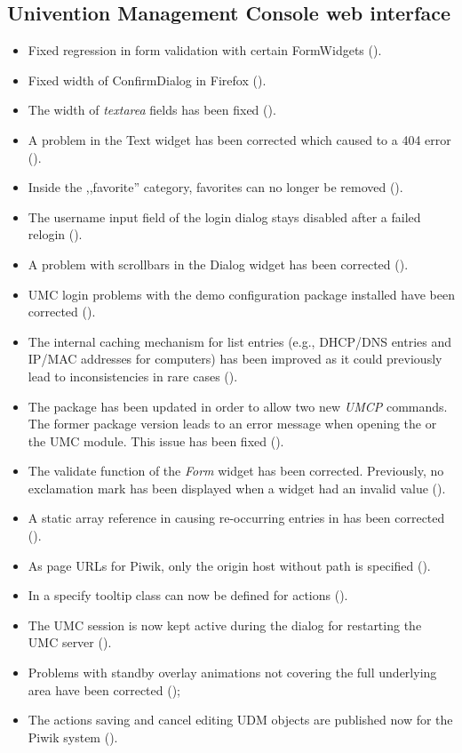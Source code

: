 \subsection{Univention Management Console web interface}
\begin{itemize}
\item Fixed regression in form validation with certain FormWidgets
  ().
\item Fixed width of ConfirmDialog in Firefox ().
\item The width of \emph{textarea} fields has been fixed
  ().
\item A problem in the Text widget has been corrected which caused to
  a 404 error ().
\item Inside the ,,favorite'' category, favorites can no longer be
  removed ().
\item The username input field of the login dialog stays disabled
  after a failed relogin ().
\item A problem with scrollbars in the Dialog widget has been
  corrected ().
\item UMC login problems with the demo configuration package installed have
  been corrected ().
\item The internal caching mechanism for list entries (e.g., DHCP/DNS
  entries and IP/MAC addresses for computers) has been improved as it
  could previously lead to inconsistencies in rare cases ().
\item The  package has been
  updated in order to allow two new \emph{UMCP} commands. The former
  package version leads to an error message when opening the
   or the  UMC module. This
  issue has been fixed ().
\item The validate function of the \emph{Form} widget has been corrected.
  Previously, no exclamation mark has been displayed when a widget had an
  invalid value ().
\item A static array reference in  causing re-occurring
  entries in  has been corrected ().
\item As page URLs for Piwik, only the origin host without path is specified ().
\item In  a specify tooltip class can now be defined for actions ().
\item The UMC session is now kept active during the dialog for restarting the UMC server ().
\item Problems with standby overlay animations not covering the full underlying area have been corrected ();
\item The actions saving and cancel editing UDM objects are published now for the Piwik system ().
\end{itemize}

